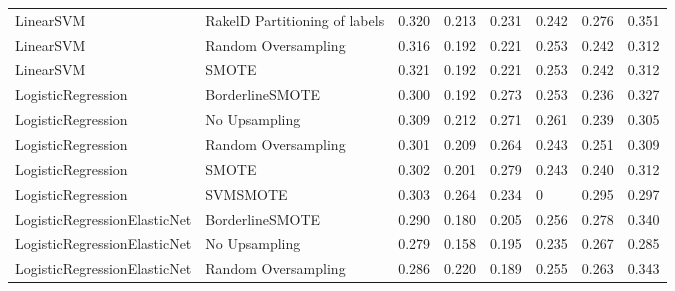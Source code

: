 \begin{tabular}{llllllll}
                      LinearSVM & RakelD Partitioning of labels & 0.320 &                     0.213 &                 0.231 &                  0.242 &                                   0.276 &     0.351 \\
                      LinearSVM &           Random Oversampling & 0.316 &                     0.192 &                 0.221 &                  0.253 &                                   0.242 &     0.312 \\
                      LinearSVM &                         SMOTE & 0.321 &                     0.192 &                 0.221 &                  0.253 &                                   0.242 &     0.312 \\
             LogisticRegression &               BorderlineSMOTE & 0.300 &                     0.192 &                 0.273 &                  0.253 &                                   0.236 &     0.327 \\
             LogisticRegression &                 No Upsampling & 0.309 &                     0.212 &                 0.271 &                  0.261 &                                   0.239 &     0.305 \\
             LogisticRegression &           Random Oversampling & 0.301 &                     0.209 &                 0.264 &                  0.243 &                                   0.251 &     0.309 \\
             LogisticRegression &                         SMOTE & 0.302 &                     0.201 &                 0.279 &                  0.243 &                                   0.240 &     0.312 \\
             LogisticRegression &                      SVMSMOTE & 0.303 &                     0.264 &                 0.234 &                      0 &                                   0.295 &     0.297 \\
   LogisticRegressionElasticNet &               BorderlineSMOTE & 0.290 &                     0.180 &                 0.205 &                  0.256 &                                   0.278 &     0.340 \\
   LogisticRegressionElasticNet &                 No Upsampling & 0.279 &                     0.158 &                 0.195 &                  0.235 &                                   0.267 &     0.285 \\
   LogisticRegressionElasticNet &           Random Oversampling & 0.286 &                     0.220 &                 0.189 &                  0.255 &                                   0.263 &     0.343 \\

\end{tabular}
